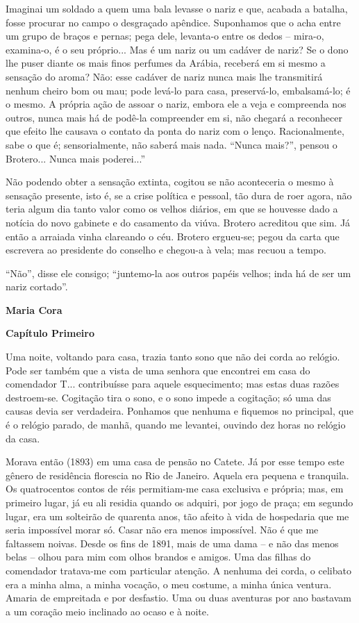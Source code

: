 Imaginai um soldado a quem uma bala levasse o nariz e que, acabada a
batalha, fosse procurar no campo o desgraçado apêndice. Suponhamos que o
acha entre um grupo de braços e pernas; pega dele, levanta-o entre os
dedos -- mira-o, examina-o, é o seu próprio... Mas é um nariz ou um
cadáver de nariz? Se o dono lhe puser diante os mais finos perfumes da
Arábia, receberá em si mesmo a sensação do aroma? Não: esse cadáver de
nariz nunca mais lhe transmitirá nenhum cheiro bom ou mau; pode levá-lo
para casa, preservá-lo, embalsamá-lo; é o mesmo. A própria ação de
assoar o nariz, embora ele a veja e compreenda nos outros, nunca mais há
de podê-la compreender em si, não chegará a reconhecer que efeito lhe
causava o contato da ponta do nariz com o lenço. Racionalmente, sabe o
que é; sensorialmente, não saberá mais nada. ``Nunca mais?'', pensou o
Brotero... Nunca mais poderei...''

Não podendo obter a sensação extinta, cogitou se não aconteceria o mesmo
à sensação presente, isto é, se a crise política e pessoal, tão dura de
roer agora, não teria algum dia tanto valor como os velhos diários, em
que se houvesse dado a notícia do novo gabinete e do casamento da viúva.
Brotero acreditou que sim. Já então a arraiada vinha clareando o céu.
Brotero ergueu-se; pegou da carta que escrevera ao presidente do
conselho e chegou-a à vela; mas recuou a tempo.

``Não'', disse ele consigo; ``juntemo-la aos outros papéis velhos; inda
há de ser um nariz cortado''.

\textbf{Maria Cora}

\textbf{Capítulo Primeiro}

Uma noite, voltando para casa, trazia tanto sono que não dei corda ao
relógio. Pode ser também que a vista de uma senhora que encontrei em
casa do comendador T... contribuísse para aquele esquecimento; mas estas
duas razões destroem-se. Cogitação tira o sono, e o sono impede a
cogitação; só uma das causas devia ser verdadeira. Ponhamos que nenhuma
e fiquemos no principal, que é o relógio parado, de manhã, quando me
levantei, ouvindo dez horas no relógio da casa.

Morava então (1893) em uma casa de pensão no Catete. Já por esse tempo
este gênero de residência florescia no Rio de Janeiro. Aquela era
pequena e tranquila. Os quatrocentos contos de réis permitiam-me casa
exclusiva e própria; mas, em primeiro lugar, já eu ali residia quando os
adquiri, por jogo de praça; em segundo lugar, era um solteirão de
quarenta anos, tão afeito à vida de hospedaria que me seria impossível
morar só. Casar não era menos impossível. Não é que me faltassem noivas.
Desde os fins de 1891, mais de uma dama -- e não das menos belas --
olhou para mim com olhos brandos e amigos. Uma das filhas do comendador
tratava-me com particular atenção. A nenhuma dei corda, o celibato era a
minha alma, a minha vocação, o meu costume, a minha única ventura.
Amaria de empreitada e por desfastio. Uma ou duas aventuras por ano
bastavam a um coração meio inclinado ao ocaso e à noite.

